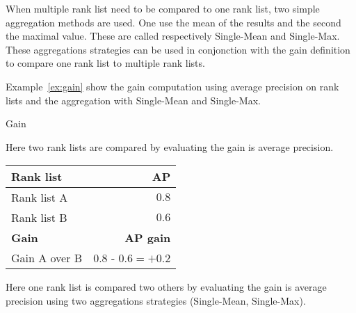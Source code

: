 When multiple rank list need to be compared to one rank list, two simple aggregation methods are used.
One use the mean of the results and the second the maximal value.
These are called respectively Single-Mean and Single-Max.
These aggregations strategies can be used in conjonction with the gain definition to compare one rank list to multiple rank lists.

Example~\ref{ex:gain} show the gain computation using average precision on rank lists and the aggregation with Single-Mean and Single-Max.

\begin{example}
  \centering
  \caption{Gain}
  \label{ex:gain}

  \begin{subexample}{\linewidth}
    \centering

    Here two rank lists are compared by evaluating the gain is average precision.

    \vspace{0.2cm}

    \begin{tabular}{l r}
      \toprule
      \textbf{Rank list} & \textbf{AP} \\
      \midrule
      Rank list A & $0.8$ \\
      Rank list B & $0.6$ \\
      \midrule
      \textbf{Gain} & \textbf{AP gain} \\
      Gain A over B & $0.8$ - $0.6 = +0.2$ \\
      \bottomrule
    \end{tabular}
  \end{subexample}

  \vspace{0.5cm}

  \begin{subexample}{\linewidth}
    \centering

    Here one rank list is compared two others by evaluating the gain is average precision using two aggregations strategies (Single-Mean, Single-Max).

    \vspace{0.2cm}


\end{subexample}
\end{example}
